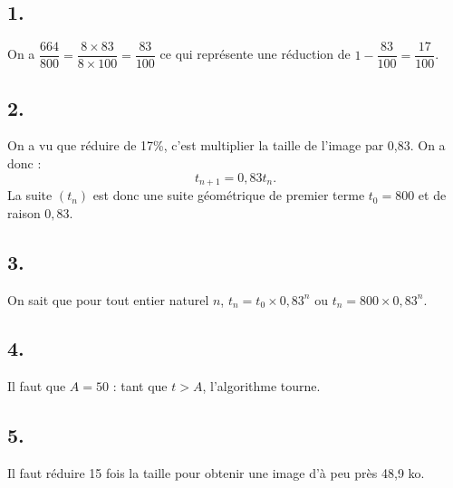 \subsection*{1.}

On a \(\dfrac{664}{800} = \dfrac{8 \times 83}{8 \times 100} = \dfrac{83}{100}\) ce qui représente une réduction de \(1 - \dfrac{83}{100} = \dfrac{17}{100}\).

\subsection*{2.}

On a vu que réduire de 17\%, c'est multiplier la taille de l'image par 0,83.  
On a donc :
\[
t_{n+1} = 0,83 t_n.
\]
La suite \((t_n)\) est donc une suite géométrique de premier terme \(t_0 = 800\) et de raison \(0,83\).

\subsection*{3.}

On sait que pour tout entier naturel \(n\), \(t_n = t_0 \times 0,83^n\) ou \(t_n = 800 \times 0,83^n\).

\subsection*{4.}

Il faut que \(A = 50\) : tant que \(t > A\), l'algorithme tourne.

\subsection*{5.}

Il faut réduire 15 fois la taille pour obtenir une image d'à peu près 48,9 ko.
